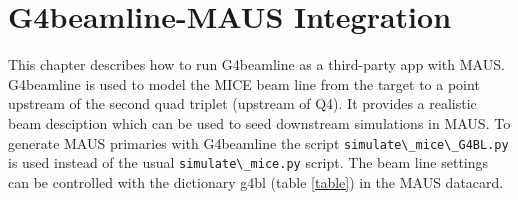 


\chapter{G4beamline-MAUS Integration}

This chapter describes how to run G4beamline as a third-party app with MAUS. G4beamline is used to model the MICE beam line from the target to a point upstream of the second quad triplet (upstream of Q4). It provides a realistic beam desciption which can be used to seed downstream simulations in MAUS. To generate MAUS primaries with G4beamline the script \verb+simulate\_mice\_G4BL.py+ is used instead of the usual \verb+simulate\_mice.py+ script. The beam line settings can be controlled with the dictionary g4bl (table \ref{table}) in the MAUS datacard. 

